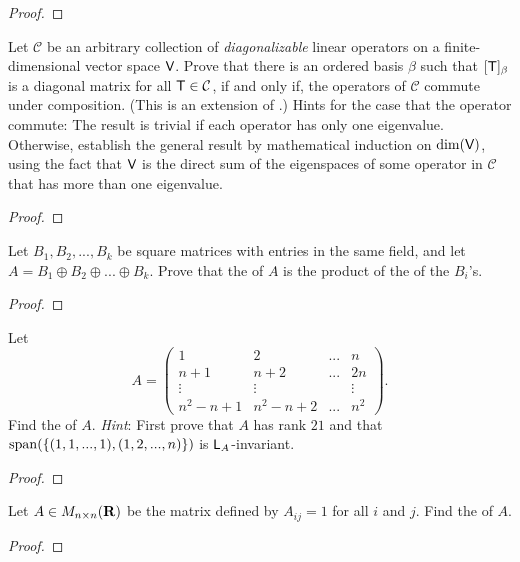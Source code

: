 \begin{proof}
\end{proof}

\begin{exercise} \label{exercise 5.4.38}
Let \(\mathcal{C}\) be an arbitrary collection of \emph{diagonalizable} linear operators on a finite-dimensional vector space \(\textsf{V}\).
Prove that there is an ordered basis \(\beta\) such that \([\textsf{T}]_{\beta}\) is a diagonal matrix for all \(\textsf{T} \in \mathcal{C}\), if and only if, the operators of \(\mathcal{C}\) commute under composition.
(This is an extension of .)
Hints for the case that the operator commute:
The result is trivial if each operator has only one eigenvalue.
Otherwise, establish the general result by mathematical induction on \(\dim(\textsf{V})\), using the fact that \(\textsf{V}\) is the direct sum of the eigenspaces of some operator in \(\mathcal{C}\) that has more than one eigenvalue.
\end{exercise}

\begin{proof}
\end{proof}

\begin{exercise} \label{exercise 5.4.39}
Let \(B_1, B_2, ..., B_k\) be square matrices with entries in the same field, and let \(A = B_1 \oplus B_2 \oplus ... \oplus B_k\).
Prove that the \CPOLY{} of \(A\) is the product of the \CPOLY{} of the \(B_i\)'s.
\end{exercise}

\begin{proof}
\end{proof}

\begin{exercise} \label{exercise 5.4.40}
Let
\[
    A = \begin{pmatrix}
        1 & 2 & ... & n \\
        n + 1 & n + 2  & ... & 2n \\
        \vdots & \vdots & & \vdots \\
        n^2 - n + 1 & n^2 - n + 2 & ... & n^2
    \end{pmatrix}.
\]
Find the \CPOLY{} of \(A\).
\emph{Hint}: First prove that \(A\) has rank \(21\) and that \(\operatorname{span}(\{ (1, 1, ... , 1), (1, 2, ..., n) \})\) is \(\textsf{L}_A\)-invariant.
\end{exercise}

\begin{proof}
\end{proof}

\begin{exercise} \label{exercise 5.4.41}
Let \(A \in M_{n \times n}(\mathbf{R})\) be the matrix defined by \(A_{ij} = 1\) for all \(i\) and \(j\).
Find the \CPOLY{} of \(A\).
\end{exercise}

\begin{proof}
\end{proof}